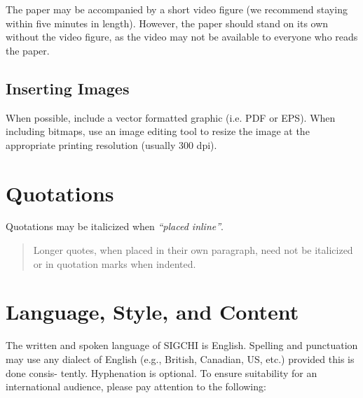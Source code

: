 \documentclass{sigchi}
\begin{document}
The paper may be accompanied by a short video figure (we recommend staying within five
minutes in length). However, the paper should stand on its own without
the video figure, as the video may not be available to everyone who
reads the paper.  

\subsection{Inserting Images}
When possible, include a vector formatted graphic (i.e. PDF or EPS).
When including bitmaps,  use an image editing tool to resize the image
at the appropriate printing resolution (usually 300 dpi).

\section{Quotations}
Quotations may be italicized when \textit{``placed inline''}.

\begin{quote}
Longer quotes, when placed in their own paragraph, need not be
italicized or in quotation marks when indented.  
\end{quote}

\section{Language, Style, and Content}

The written and spoken language of SIGCHI is English. Spelling and
punctuation may use any dialect of English (e.g., British, Canadian,
US, etc.) provided this is done consis- tently. Hyphenation is
optional. To ensure suitability for an international audience, please
pay attention to the following:
\end{document}
